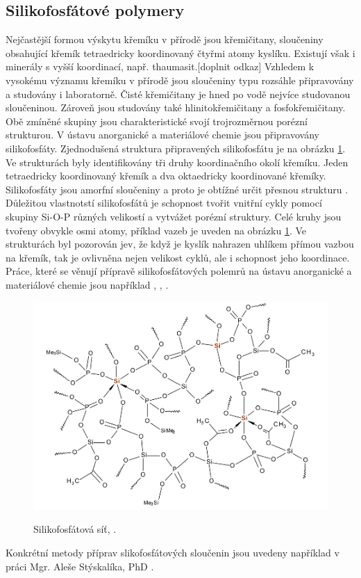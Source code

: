 \documentclass[
  digital, %
  table,   %
  lof,     %
  lot,     %
]{fithesis3}
\begin{document}
\subsection{Silikofosfátové polymery}
Nejčastější formou výskytu křemíku v přírodě jsou křemičitany, sloučeniny obsahující křemík tetraedricky koordinovaný čtyřmi atomy kyslíku. Existují však i minerály s vyšší koordinací, např. thaumasit.[doplnit odkaz] Vzhledem k vysokému významu křemíku v přírodě jsou sloučeniny typu  rozsáhle připravovány a studovány i laboratorně. Čisté křemičitany  je hned po vodě nejvíce studovanou sloučeninou. Zároveň jsou studovány také hlinitokřemičitany a fosfokřemičitany. Obě zmíněné skupiny jsou charakteristické svojí trojrozměrnou  porézní strukturou.
V ústavu anorganické a materiálové chemie jsou připravovány silikofosfáty. Zjednodušená struktura připravených silikofosfátu je na obrázku \ref{si_polymer_cely}. Ve strukturách byly identifikovány tři druhy koordinačního okolí křemíku. Jeden tetraedricky koordinovaný křemík a dva oktaedricky koordinované křemíky. Silikofosfáty jsou amorfní sloučeniny a proto je obtížné určit přesnou strukturu \cite{Styskalik2015thesis}. Důležitou vlastnotstí silikofosfátů je schopnost tvořit vnitřní cykly pomocí skupiny Si-O-P různých velikostí a vytvážet porézní struktury. Celé kruhy jsou tvořeny obvykle osmi atomy, příklad vazeb je uveden na obrázku \ref{si_polymer_cely}.
 Ve strukturách byl pozorován jev, že když je kyslík nahrazen uhlíkem přímou vazbou na křemík, tak je ovlivněna nejen velikost cyklů, ale i schopnost jeho koordinace. Práce, které se věnují přípravě silikofosfátových polemrů na ústavu anorganické a materiálové chemie jsou například \cite{1401364}, \cite{1349974}, \cite{1393656}.
\begin{figure}[h!]
\caption{Silikofosfátová síť, \cite{Styskalik2015thesis}. }
  \center
  \includegraphics[width=12cm]{si_polymer_cely.png}
  \label{si_polymer_cely}
  \end{figure}
  Konkrétní metody příprav slikofosfátových sloučenin jsou uvedeny například v práci Mgr. Aleše Stýskalíka, PhD  \cite{Styskalik2015thesis}.
\end{document}
